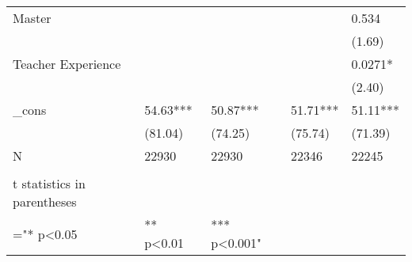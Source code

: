 \documentclass{article}
\begin{document}
\begin{table}[htbp]
\begin{tabular}{lllrr}
    Master &       &       & \multicolumn{1}{l}{} & \multicolumn{1}{l}{0.534} \\
          &       &       & \multicolumn{1}{l}{} & \multicolumn{1}{l}{(1.69)} \\
    Teacher Experience &       &       & \multicolumn{1}{l}{} & \multicolumn{1}{l}{0.0271*} \\
          &       &       & \multicolumn{1}{l}{} & \multicolumn{1}{l}{(2.40)} \\
    \_cons & 54.63*** & 50.87*** & \multicolumn{1}{l}{51.71***} & \multicolumn{1}{l}{51.11***} \\
          & (81.04) & (74.25) & \multicolumn{1}{l}{(75.74)} & \multicolumn{1}{l}{(71.39)} \\
    N     & 22930 & 22930 & \multicolumn{1}{l}{22346} & \multicolumn{1}{l}{22245} \\
          &       &       &       &  \\
    t statistics in parentheses &       &       &       &  \\
    ="* p<0.05 &  ** p<0.01 &  *** p<0.001" &       &  \\
    \bottomrule
    \end{tabular}%
  \label{tab:addlabel}%
\end{table}%
\end{document}
